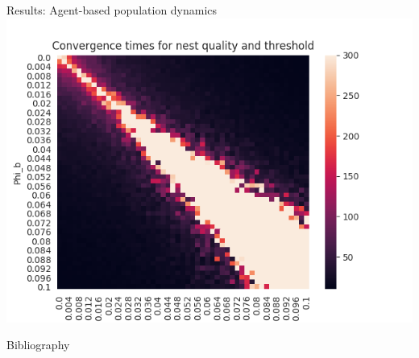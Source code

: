 \documentclass{beamer}
\begin{document}
\begin{frame}{Results: Agent-based population dynamics}
    \includegraphics[scale=0.5]{distance_agent_convergence_times}
\end{frame}

  \begin{frame}{Bibliography}
      
  \end{frame}
\end{document}
